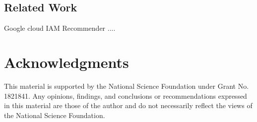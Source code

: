 \documentclass[sigconf]{acmart}
\begin{document}
\subsection{Related Work}
Google cloud IAM Recommender ....


\section{Acknowledgments}

This material is supported by the National Science Foundation under Grant No. 1821841. Any
opinions, findings, and conclusions or recommendations expressed in this material are those of the
author and do not necessarily reflect the views
of the National Science Foundation.







\appendix
\end{document}

